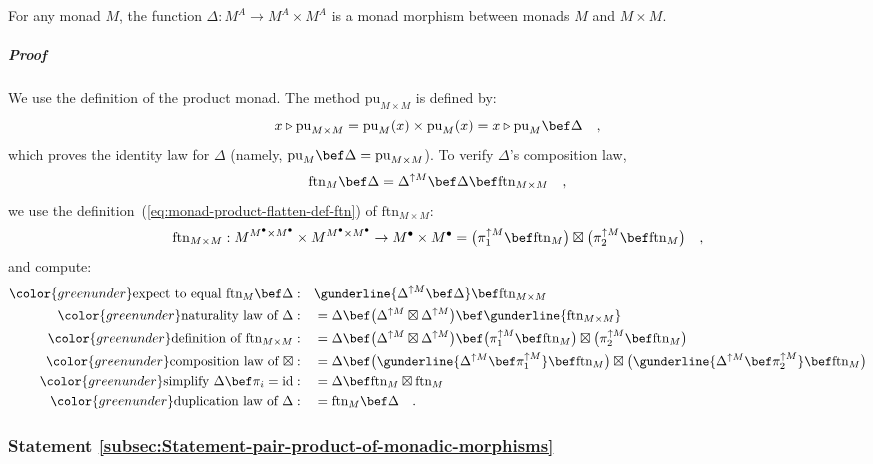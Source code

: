 For any monad $M$, the function $\Delta:M^{A}\rightarrow M^{A}\times M^{A}$
is a monad morphism between monads $M$ and $M\times M$.

\subparagraph{Proof}

We use the definition of the product monad. The method $\text{pu}_{M\times M}$
is defined by:
\[
x\triangleright\text{pu}_{M\times M}=\text{pu}_{M}(x)\times\text{pu}_{M}(x)=x\triangleright\text{pu}_{M}\bef\Delta\quad,
\]
which proves the identity law for $\Delta$ (namely, $\text{pu}_{M}\bef\Delta=\text{pu}_{M\times M}$).
To verify $\Delta$\textsf{'}s composition law, 
\[
\text{ftn}_{M}\bef\Delta=\Delta^{\uparrow M}\bef\Delta\bef\text{ftn}_{M\times M}\quad,
\]
we use the definition~(\ref{eq:monad-product-flatten-def-ftn}) of
$\text{ftn}_{M\times M}$:
\[
\text{ftn}_{M\times M}:M^{M^{\bullet}\times M^{\bullet}}\times M^{M^{\bullet}\times M^{\bullet}}\rightarrow M^{\bullet}\times M^{\bullet}=\big(\pi_{1}^{\uparrow M}\bef\text{ftn}_{M}\big)\boxtimes\big(\pi_{2}^{\uparrow M}\bef\text{ftn}_{M}\big)\quad,
\]
and compute:
\begin{align*}
{\color{greenunder}\text{expect to equal }\text{ftn}_{M}\bef\Delta:}\quad & \gunderline{\Delta^{\uparrow M}\bef\Delta}\bef\text{ftn}_{M\times M}\\
{\color{greenunder}\text{naturality law of }\Delta:}\quad & =\Delta\bef\big(\Delta^{\uparrow M}\boxtimes\Delta^{\uparrow M}\big)\bef\gunderline{\text{ftn}_{M\times M}}\\
{\color{greenunder}\text{definition of }\text{ftn}_{M\times M}:}\quad & =\Delta\bef\big(\Delta^{\uparrow M}\boxtimes\Delta^{\uparrow M}\big)\bef\big(\pi_{1}^{\uparrow M}\bef\text{ftn}_{M}\big)\boxtimes\big(\pi_{2}^{\uparrow M}\bef\text{ftn}_{M}\big)\\
{\color{greenunder}\text{composition law of }\boxtimes:}\quad & =\Delta\bef\big(\gunderline{\Delta^{\uparrow M}\bef\pi_{1}^{\uparrow M}}\bef\text{ftn}_{M}\big)\boxtimes\big(\gunderline{\Delta^{\uparrow M}\bef\pi_{2}^{\uparrow M}}\bef\text{ftn}_{M}\big)\\
{\color{greenunder}\text{simplify }\Delta\bef\pi_{i}=\text{id}:}\quad & =\Delta\bef\text{ftn}_{M}\boxtimes\text{ftn}_{M}\\
{\color{greenunder}\text{duplication law of }\Delta:}\quad & =\text{ftn}_{M}\bef\Delta\quad.
\end{align*}


\subsubsection{Statement \label{subsec:Statement-pair-product-of-monadic-morphisms}\ref{subsec:Statement-pair-product-of-monadic-morphisms}}

